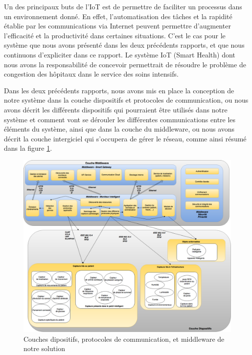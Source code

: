 Un des principaux buts de l’IoT est de permettre de faciliter un processus dans un environnement donné. En effet, l’automatisation
des tâches et la rapidité établie par les communications via Internet peuvent permettre d’augmenter l’efficacité et la
productivité dans certaines situations. C’est le cas pour le système que nous avons présenté dans les deux précédents rapports, et
que nous continuons d’expliciter dans ce rapport. Le système IoT (Smart Health) dont nous avons la responsabilité de concevoir
permettrait de résoudre le problème de congestion des hôpitaux dans le service des soins intensifs.  
\newline

Dans les deux précédents rapports, nous avons mis en place la conception de notre système dans la couche dispositifs et protocoles
de communication, ou nous avons décrit les différents dispositifs qui pourraient être utilisés dans notre système et comment vont
se dérouler les différentes communications entre les éléments du système, ainsi que dans la couche du middleware, ou nous avons
décrit la couche intergiciel qui s’occupera de gérer le réseau, comme ainsi résumé dans la figure \ref{DispositifsMiddleware}.  
\newline
\begin{figure}[h!]
	\hspace*{-2.5cm}
	\centering
	\includegraphics[width=1.4\textwidth]{DispositifsMiddleware.png}
	\caption{Couches dipositifs, protocoles de communication, et middleware de notre solution}
	\label{DispositifsMiddleware}
\end{figure}

